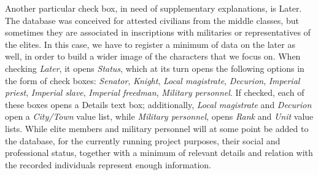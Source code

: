 \documentclass[amsthm,ebook]{saparticle}
\begin{document}
Another particular check box, in need of supplementary explanations, is Later. The database was conceived for attested
civilians from the middle classes, but sometimes they are associated in inscriptions with militaries or representatives
of the elites. In this case, we have to register a minimum of data on the later as well, in order to build a wider
image of the characters that we focus on. When checking \emph{Later}, it opens \emph{Status}, which at its turn opens the following
options in the form of check boxes: \emph{Senator}, \emph{Knight}, \emph{Local magistrate}, \emph{Decurion}, \emph{Imperial priest}, \emph{Imperial slave},
\emph{Imperial freedman}, \emph{Military personnel}. If checked, each of these boxes opens a Details text box; additionally, \emph{Local
magistrate} and \emph{Decurion} open a \emph{City/Town} value list, while \emph{Military personnel}, opens \emph{Rank} and \emph{Unit} value lists. While
elite members and military personnel will at some point be added to the database, for the currently running project
purposes, their social and professional status, together with a minimum of relevant details and relation with the
recorded individuals represent enough information. 
\vspace{20pt}




\tablelasttail{\hline}
\end{document}
